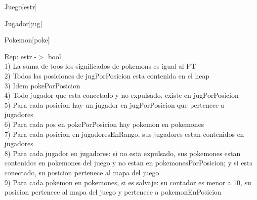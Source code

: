 \begin{Representacion}
	\begin{Estructura}{Juego}[estr]
		\begin{Tupla}[estr]
		\end{Tupla}
	\end{Estructura}
	
	\begin{Estructura}{Jugador}[jug]
		\begin{Tupla}[jug]
		\end{Tupla}
	\end{Estructura}
	
	\begin{Estructura}{Pokemon}[poke]
		\begin{Tupla}[poke]
		\end{Tupla}
	\end{Estructura}
\end{Representacion}



 Rep: estr -$>$ bool
 \\
 1) La suma de toos los significados de pokemons es igual al PT
 \\
 2) Todos las posiciones de jugPorPosicion esta contenida en el heap
 \\
 3) Idem pokePorPosicion
 \\
 4) Todo jugador que esta conectado y no expulsado, existe en jugPorPosicion
 \\
 5) Para cada posicion hay un jugador en jugPorPosicion que pertenece a jugadores
 \\
 6) Para cada pos en pokePorPosicion hay pokemon en pokemones
 \\
 7) Para cada posicion en jugadoresEnRango, sus jugadores estan contenidos en jugadores
 \\
 8) Para cada jugador en jugadores: si no esta expulsado, sus pokemones estan contenidos en pokemones del juego y no estan en pokemonesPorPosicion; y si esta conectado, su posicion pertenece al mapa del juego
 \\
 9) Para cada pokemon en pokemones, si es salvaje: su contador es menor a 10, su posicion pertenece al mapa del juego y pertenece a pokemonEnPosicion
 

